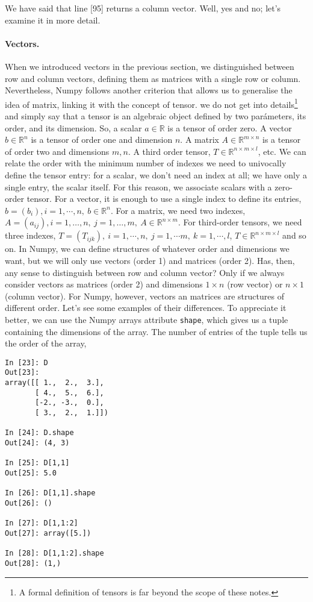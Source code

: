 \begin{paracol}{2}
We have said that line [95] returns a column vector. Well, yes and no; let's examine it in more detail.

\paragraph{Vectors.} When we introduced vectors in the previous section, we distinguished between row and column vectors, defining them as matrices with a single row or column. Nevertheless, Numpy follows another criterion that allows us to generalise the idea of matrix, linking it with the concept of tensor. we do not get into details\footnote{A formal definition of tensors is far beyond the scope of these notes.} and simply say that a tensor is an algebraic object defined by two parámeters, its order, and its dimension. So, a scalar $a \in \mathbb{R}$ is a tensor of order zero. A vector $b \in \mathbb{R}^n$ is a tensor of order one and dimension $n$. A matrix $A\in \mathbb{R}^{m\times n}$ is a tensor of order two and dimensions $m,n$. A third order tensor, $T\in\mathbb{R}^{n\times m\times l}$, etc. We can relate the order with the minimum number of indexes we need to univocally define the tensor entry: for a scalar, we don't need an index at all; we have only a single entry, the scalar itself. For this reason, we associate scalars with a zero-order tensor. For a vector, it is enough to use a single index to define its entries, $b=(b_i), i = 1,\cdots, n,\ b \in \mathbb{R}^n$. For a matrix, we need two indexes, $A = (a_{ij}), i =1,\dots,n,\ j = 1,\dots,m,\ A \in \mathbb{R}^{n\times m}$. For third-order tensors, we need three indexes, $T=(T_{ijk}),\ i =1,\cdots, n,\ j =1,\cdots m,\ k = 1,\cdots, l$, $T\in \mathbb{R}^{n\times m \times l}$ and so on. In Numpy, we can define structures of whatever order and dimensions we want, but we will only use vectors (order 1) and matrices (order 2). Has, then, any sense to distinguish between row and column vector? Only if we always consider vectors as matrices (order 2) and dimensions $1\times n$ (row vector) or $n\times 1$ (column vector). For Numpy, however, vectors an matrices are structures of different order. Let's see some examples of their differences. To appreciate it better, we can use the Numpy arrays attribute \texttt{shape}, which gives us a tuple containing the dimensions of the array. The number of entries of the tuple tells us the order of the array,     
\end{paracol}
\begin{center}
    \begin{minipage}{0.3\textwidth}
    \begin{verbatim}
In [23]: D
Out[23]: 
array([[ 1.,  2.,  3.],
       [ 4.,  5.,  6.],
       [-2., -3.,  0.],
       [ 3.,  2.,  1.]])

In [24]: D.shape
Out[24]: (4, 3)

In [25]: D[1,1]
Out[25]: 5.0

In [26]: D[1,1].shape
Out[26]: ()

In [27]: D[1,1:2]
Out[27]: array([5.])

In [28]: D[1,1:2].shape
Out[28]: (1,)
\end{verbatim}
\end{minipage}
\end{center}
